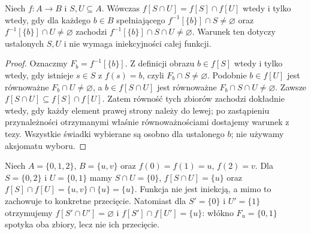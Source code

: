 \begin{twierdzenie}
\label{thm:image-intersection-fibers-lxvi}
Niech $f:A\to B$ i $S,U\subseteq A$. Wówczas
$f[S\cap U]=f[S]\cap f[U]$ wtedy i tylko wtedy, gdy
dla każdego $b\in B$ spełniającego
$f^{-1}[\{b\}]\cap S\ne\varnothing$ oraz
$f^{-1}[\{b\}]\cap U\ne\varnothing$ zachodzi
$f^{-1}[\{b\}]\cap S\cap U\ne\varnothing$.
Warunek ten dotyczy ustalonych $S,U$ i nie wymaga
iniekcyjności całej funkcji.
\end{twierdzenie}
\begin{proof}
Oznaczmy $F_b=f^{-1}[\{b\}]$. Z definicji obrazu
$b\in f[S]$ wtedy i tylko wtedy, gdy istnieje $s\in S$
z $f(s)=b$, czyli $F_b\cap S\ne\varnothing$.
Podobnie $b\in f[U]$ jest równoważne
$F_b\cap U\ne\varnothing$, a $b\in f[S\cap U]$
jest równoważne $F_b\cap S\cap U\ne\varnothing$.
Zawsze $f[S\cap U]\subseteq f[S]\cap f[U]$.
Zatem równość tych zbiorów zachodzi dokładnie wtedy,
gdy każdy element prawej strony należy do lewej;
po zastąpieniu przynależności otrzymanymi właśnie
równoważnościami dostajemy warunek z tezy.
Wszystkie świadki wybierane są osobno dla ustalonego $b$;
nie używamy aksjomatu wyboru.
\end{proof}
\begin{przyklad}
Niech $A=\{0,1,2\}$, $B=\{u,v\}$ oraz
$f(0)=f(1)=u$, $f(2)=v$. Dla $S=\{0,2\}$ i
$U=\{0,1\}$ mamy $S\cap U=\{0\}$,
$f[S\cap U]=\{u\}$ oraz
$f[S]\cap f[U]=\{u,v\}\cap\{u\}=\{u\}$.
Funkcja nie jest iniekcją, a mimo to zachowuje to
konkretne przecięcie. Natomiast dla $S'=\{0\}$ i
$U'=\{1\}$ otrzymujemy $f[S'\cap U']=\varnothing$
i $f[S']\cap f[U']=\{u\}$: włókno $F_u=\{0,1\}$
spotyka oba zbiory, lecz nie ich przecięcie.
\end{przyklad}

